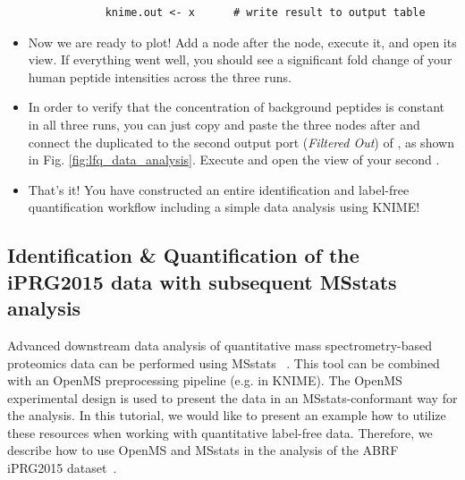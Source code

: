 \begin{itemize}
\begin{lstlisting}
            knime.out <- x      # write result to output table
        \end{lstlisting}
    \item Now we are ready to plot! Add a  node  after the  node, execute it, and open its view. If everything went well, you should see a significant fold change of your human peptide intensities across the three runs.
    \item In order to verify that the concentration of background peptides is constant in all three runs, you can just copy and paste the three nodes after  and connect the duplicated  to the second output port (\textit{Filtered Out}) of , as shown in Fig. \ref{fig:lfq_data_analysis}. Execute and open the view of your second .
    \item That's it! You have constructed an entire identification and label-free quantification workflow including a simple data analysis using KNIME!
\end{itemize}
 


\subsection{Identification \& Quantification of the iPRG2015 data with subsequent MSstats analysis}
Advanced downstream data analysis of quantitative mass spectrometry-based proteomics data can be performed using MSstats ~\cite{Choi2014MSstats}. This tool can be combined with an OpenMS preprocessing pipeline (e.g. in KNIME). The OpenMS experimental design is used to present the data in an MSstats-conformant way for the analysis. In this tutorial, we would like to present an example how to utilize these resources when working with quantitative label-free data. Therefore, we describe how to use OpenMS and MSstats in the analysis of the ABRF iPRG2015 dataset~\cite{Choi2017iPRG}.

